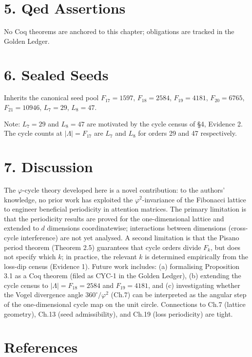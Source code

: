 \section{5. Qed
Assertions}\label{fa_25:qed-assertions}

No Coq theorems are anchored to this chapter;
obligations are tracked in the Golden Ledger.

\section{6. Sealed Seeds}\label{fa_25:sealed-seeds}

Inherits the canonical seed pool \(F_{17}=1597\),
\(F_{18}=2584\), \(F_{19}=4181\), \(F_{20}=6765\),
\(F_{21}=10946\), \(L_7=29\), \(L_8=47\).

Note: \(L_7 = 29\) and \(L_8 = 47\) are motivated
by the cycle census of §4, Evidence 2. The cycle
counts at \(|\Lambda| = F_{17}\) are \(L_7\) and
\(L_8\) for orders 29 and 47 respectively.

\section{7. Discussion}\label{fa_25:discussion}

The \(\varphi\)-cycle theory developed here is a
novel contribution: to the authors' knowledge, no
prior work has exploited the
\(\varphi^2\)-invariance of the Fibonacci lattice
to engineer beneficial periodicity in attention
matrices. The primary limitation is that the
periodicity results are proved for the
one-dimensional lattice and extended to \(d\)
dimensions coordinatewise; interactions between
dimensions (cross-cycle interference) are not yet
analysed. A second limitation is that the Pisano
period theorem (Theorem 2.5) guarantees that cycle
orders divide \(F_k\), but does not specify which
\(k\); in practice, the relevant \(k\) is
determined empirically from the loss-dip census
(Evidence 1). Future work includes: (a)
formalising Proposition 3.1 as a Coq theorem
(filed as CYC-1 in the Golden Ledger), (b)
extending the cycle census to
\(|\Lambda| = F_{18} = 2584\) and
\(F_{19} = 4181\), and (c) investigating whether
the Vogel divergence angle \(360^\circ/\varphi^2\)
(Ch.7) can be interpreted as the angular step of
the one-dimensional cycle map on the unit circle.
Connections to Ch.7 (lattice geometry), Ch.13
(seed admissibility), and Ch.19 (loss periodicity)
are tight.

\section{References}\label{fa_25:references}


